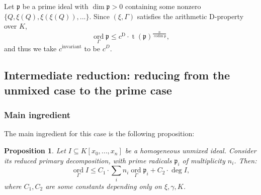 \documentclass[reqno]{amsart}
\theoremstyle{plain}
\newtheorem{Prop}[Cor]{Proposition}
\theoremstyle{definition}
\theoremstyle{remark}
\theoremstyle{plain}
\begin{document}
Let $\mathfrak p$ be a prime ideal with $\dim\mathfrak p>0$ containing some nonzero $\{Q,\xi(Q),\xi(\xi(Q)),...\}$.
Since $(\xi,\Gamma)$ satisfies the arithmetic D-property over $K$,
\[
    \operatorname*{ord}_{\Gamma}\mathfrak p
        \leq
    c^\mathrm{D}\cdot\operatorname{t}(\mathfrak p)^{\frac{n}{\operatorname{codim}\mathfrak p}}
,\]
and thus we take $c^\mathrm{invariant}$ to be $c^D$.

\subsection{Intermediate reduction: reducing from the unmixed case to the prime case}

\subsubsection{Main ingredient}

The main ingredient for this case is the following proposition:

\begin{Prop}\label{Proposition I = intersection of pi}
Let $I\subseteq K[x_0,...,x_n]$ be a homogeneous unmixed ideal. Consider its reduced primary decomposition, with prime radicals $\mathfrak p_i$ of multiplicity $n_i$. Then:
\[
    \operatorname*{ord}_{\Gamma}I
        \leq
    C_1\cdot\sum_i n_i\operatorname*{ord}_{\Gamma}\mathfrak p_i
        +
    C_2\cdot\deg I
,\]
where $C_1,C_2$ are some constants depending only on $\xi,\gamma,K$.
\end{Prop}
\end{document}
